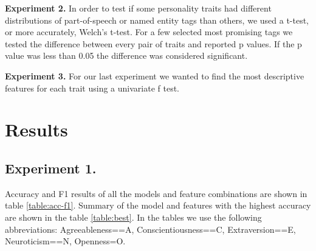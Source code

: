 \documentclass[10pt, a4paper]{article}
\begin{document}
\textbf{Experiment 2.}  In order to test if some personality traits had different distributions of part-of-speech or named entity tags than others, we used a t-test, or more accurately, Welch’s t-test.
For a few selected most promising tags we tested the difference between every pair of traits and reported p values.
If the p value was less than 0.05 the difference was considered significant.

\textbf{Experiment 3.} For our last experiment we wanted to find the most descriptive features for each trait using a univariate f test.

\section{Results}

\subsection{Experiment 1.}
Accuracy and F1 results of all the models and feature combinations are shown in table \ref{table:acc-f1}.
Summary of the model and features with the highest accuracy are shown in the table \ref{table:best}.
In the tables we use the following abbreviations: Agreeableness==A, Conscientiousness==C, Extraversion==E, Neuroticism==N, Openness=O.
\end{document}
